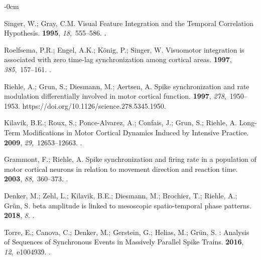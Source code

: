 \documentclass[brainsci, %
               review,accept,pdftex,moreauthors
               ]{Definitions/mdpi}
\begin{document}
\begin{adjustwidth}{-\extralength}{0cm}
\begin{thebibliography}{999}
Singer, W.; Gray, C.M.
\newblock Visual {Feature} {Integration} and the {Temporal} {Correlation}
  {Hypothesis}.
 {\bf 1995}, {\em 18},~555--586.
.

Roelfsema, P.R.; Engel, A.K.; König, P.; Singer, W.
\newblock Visuomotor integration is associated with zero time-lag
  synchronization among cortical areas.
 {\bf 1997}, {\em 385},~157--161.
.

Riehle, A.; Grun, S.; Diesmann, M.; Aertsen, A.
\newblock Spike synchronization and rate modulation differentially involved in
  motor cortical function.
 {\bf 1997}, {\em 278},~1950--1953.
  {{https://doi.org/10.1126/science.278.5345.1950}}.

Kilavik, B.E.; Roux, S.; Ponce-Alvarez, A.; Confais, J.; Grun, S.; Riehle, A.
\newblock Long-{Term} {Modifications} in {Motor} {Cortical} {Dynamics}
  {Induced} by {Intensive} {Practice}.
 {\bf 2009}, {\em 29},~12653--12663.
.

Grammont, F.; Riehle, A.
\newblock Spike synchronization and firing rate in a population of motor
  cortical neurons in relation to movement direction and reaction time.
 {\bf 2003}, {\em 88},~360--373.
.

Denker, M.; Zehl, L.; Kilavik, B.E.; Diesmann, M.; Brochier, T.; Riehle, A.;
  Grün, S.
 beta amplitude is linked to mesoscopic spatio-temporal phase
  patterns.
 {\bf 2018}, {\em 8}.
.

Torre, E.; Canova, C.; Denker, M.; Gerstein, G.; Helias, M.; Grün, S.
: {Analysis} of {Sequences} of {Synchronous} {Events} in
  {Massively} {Parallel} {Spike} {Trains}.
 {\bf 2016}, {\em 12},~e1004939.
.


\end{thebibliography}
\end{adjustwidth}
\end{document}
